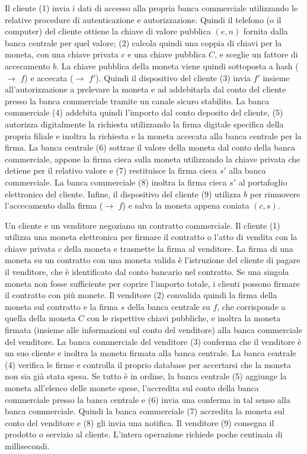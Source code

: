 \documentclass{article}
\begin{document}
Il cliente (1) invia i dati di accesso alla propria banca commerciale 
utilizzando le relative procedure di autenticazione e autorizzazione. 
Quindi il telefono (o il computer) del cliente ottiene la chiave di 
valore pubblica $(e, n)$ fornita dalla banca centrale per quel valore; (2) 
calcola quindi una coppia di chiavi per la moneta, con una chiave 
privata $c$ e una chiave pubblica $C$, e sceglie un fattore di accecamento 
$b$. La chiave pubblica della moneta viene quindi sottoposta a hash 
($\to$ $f$) e accecata ($\to$ $f'$). Quindi il dispositivo del cliente (3) 
invia $f'$ insieme all'autorizzazione a prelevare la moneta e ad 
addebitarla dal conto del cliente presso la banca commerciale tramite un 
canale sicuro stabilito. La banca commerciale (4) addebita quindi  
l'importo dal conto deposito del cliente, (5) autorizza digitalmente la 
richiesta utilizzando la firma digitale specifica della propria filiale 
e inoltra la richiesta e la moneta accecata alla banca centrale per la 
firma. La banca centrale (6) sottrae il valore della moneta dal conto 
della banca commerciale, appone la firma cieca sulla moneta 
utilizzando la chiave privata che detiene per il relativo valore e (7) 
restituisce la firma cieca $s'$ alla banca commerciale. La banca 
commerciale (8) inoltra la firma cieca $s'$ al portafoglio elettronico 
del cliente. Infine, il dispositivo del cliente (9) utilizza $b$ per 
rimuovere l'accecamento dalla firma ($\to$ $f$) e salva la moneta appena 
coniata $(c, s)$.

Un cliente e un venditore negoziano un contratto commerciale. Il 
cliente (1) utilizza una moneta elettronica per firmare il contratto o 
l'atto di vendita con la chiave privata $c$ della moneta e trasmette la 
firma al venditore. La firma di una moneta su un contratto con una 
moneta valida è l'istruzione del cliente di pagare il venditore, che è 
identificato dal conto bancario nel contratto. Se una singola moneta 
non fosse sufficiente per coprire l'importo totale, i clienti possono 
firmare il contratto con più monete. Il venditore (2) convalida quindi 
la firma della moneta sul contratto e la firma $s$ della banca centrale 
su $f$, che  corrisponde a quella della moneta $C$ con le rispettive 
chiavi pubbliche, e inoltra la moneta firmata (insieme alle 
informazioni sul conto del venditore) alla banca commerciale del 
venditore. La banca commerciale del venditore (3) conferma che il 
venditore è un suo cliente e inoltra la moneta firmata alla banca 
centrale. La banca centrale (4) verifica le firme e controlla il 
proprio database per accertarsi che la moneta non sia già stata spesa. 
Se tutto è in ordine, la banca centrale (5) aggiunge la moneta 
all'elenco delle monete spese, l'accredita sul conto della banca 
commerciale presso la banca centrale e (6) invia una conferma in tal 
senso alla banca commerciale. Quindi la banca commerciale (7) 
accredita la moneta sul conto del venditore e (8) gli invia una 
notifica. Il venditore (9) consegna il prodotto o servizio al cliente. 
L'intera operazione richiede poche centinaia di millisecondi.
\end{document}
